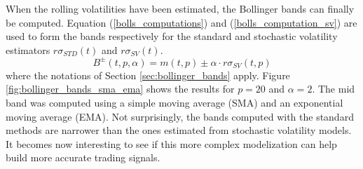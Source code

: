 \documentclass[11pt,a4,twosided,singlespacing,titlepagenumber=on]{scrreprt}
\numberwithin{equation}{chapter} %
\theoremstyle{remark}
\begin{document}
When the rolling volatilities have been estimated, the Bollinger bands can finally be computed. Equation (\ref{bolls_computations}) and (\ref{bolls_computation_sv}) are used to form the bands respectively for the standard and stochastic volatility estimators $r\sigma_{STD}(t)$ and $r\sigma_{SV}(t)$.
\begin{equation}
\label{bolls_computation_sv}
B^\pm(t,p,\alpha) = m(t,p) \pm \alpha \cdot r\sigma_{SV}(t,p)
\end{equation}
where the notations of Section \ref{sec:bollinger_bands} apply. Figure \ref{fig:bollinger_bands_sma_ema} shows the results for $p=20$ and $\alpha = 2$. The mid band was computed using a simple moving average (SMA) and an exponential moving average (EMA). Not surprisingly, the bands computed with the standard methods are narrower than the ones estimated from stochastic volatility models. It becomes now interesting to see if this more complex modelization can help build more accurate trading signals.
\end{document}
